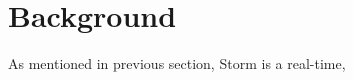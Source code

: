\chapter{Background}
\label{chap:background}

As mentioned in previous section, Storm \cite{Aniello:2013:AOS:2488222.2488267} is a real-time, 
